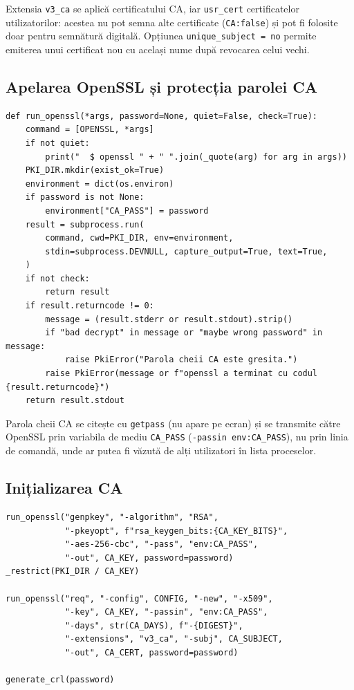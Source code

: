\documentclass[12pt,a4paper]{article}
\begin{document}
Extensia \texttt{v3\_ca} se aplică certificatului CA, iar \texttt{usr\_cert}
certificatelor utilizatorilor: acestea nu pot semna alte certificate
(\texttt{CA:false}) și pot fi folosite doar pentru semnătură digitală.
Opțiunea \texttt{unique\_subject = no} permite emiterea unui certificat nou cu
același nume după revocarea celui vechi.

\subsection{Apelarea OpenSSL și protecția parolei CA}

\begin{lstlisting}[caption={Funcția care execută comenzile OpenSSL}]
def run_openssl(*args, password=None, quiet=False, check=True):
    command = [OPENSSL, *args]
    if not quiet:
        print("  $ openssl " + " ".join(_quote(arg) for arg in args))
    PKI_DIR.mkdir(exist_ok=True)
    environment = dict(os.environ)
    if password is not None:
        environment["CA_PASS"] = password
    result = subprocess.run(
        command, cwd=PKI_DIR, env=environment,
        stdin=subprocess.DEVNULL, capture_output=True, text=True,
    )
    if not check:
        return result
    if result.returncode != 0:
        message = (result.stderr or result.stdout).strip()
        if "bad decrypt" in message or "maybe wrong password" in message:
            raise PkiError("Parola cheii CA este gresita.")
        raise PkiError(message or f"openssl a terminat cu codul {result.returncode}")
    return result.stdout
\end{lstlisting}

Parola cheii CA se citește cu \texttt{getpass} (nu apare pe ecran) și se
transmite către OpenSSL prin variabila de mediu \texttt{CA\_PASS}
(\texttt{-passin env:CA\_PASS}), nu prin linia de comandă, unde ar putea fi
văzută de alți utilizatori în lista proceselor.

\subsection{Inițializarea CA}

\begin{lstlisting}[caption={Generarea cheii root și a certificatului autosemnat}]
run_openssl("genpkey", "-algorithm", "RSA",
            "-pkeyopt", f"rsa_keygen_bits:{CA_KEY_BITS}",
            "-aes-256-cbc", "-pass", "env:CA_PASS",
            "-out", CA_KEY, password=password)
_restrict(PKI_DIR / CA_KEY)

run_openssl("req", "-config", CONFIG, "-new", "-x509",
            "-key", CA_KEY, "-passin", "env:CA_PASS",
            "-days", str(CA_DAYS), f"-{DIGEST}",
            "-extensions", "v3_ca", "-subj", CA_SUBJECT,
            "-out", CA_CERT, password=password)

generate_crl(password)
\end{lstlisting}
\end{document}
